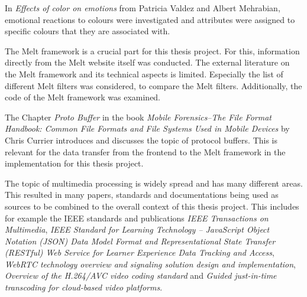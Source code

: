 \documentclass[../MasterThesis.tex]{subfiles}
\begin{document}
\begin{description}[font=\color{RedViolet!80!black}, style=nextline]
		
		In \textit{Effects of color on emotions} from Patricia Valdez and Albert Mehrabian, emotional reactions to colours were investigated and attributes were assigned to specific colours that they are associated with.~\cite{colour2}
	
		
		
		\item[Melt framework]
		
		
		The Melt framework is a crucial part for this thesis project. For this, information directly from the Melt website itself was conducted. The external literature on the Melt framework and its technical aspects is limited. Especially the list of different Melt filters was considered, to compare the Melt filters. Additionally, the code of the Melt framework was examined.~\cite{melt, melt_filters, melt_code}

		
	
		
		
		\item[Protocol buffer] 
		
		The Chapter \textit{Proto Buffer} in the book \textit{Mobile Forensics--The File Format Handbook: Common File Formats and File Systems Used in Mobile Devices} by Chris Currier introduces and discusses the topic of protocol buffers. This is relevant for the data transfer from the frontend to the Melt framework in the implementation for this thesis project.~\cite{protobuffer}
		
		
		
		
				
		
		
		\item[Multimedia processing] 
		
		The topic of multimedia processing is widely spread and has many different areas. This resulted in many papers, standards and documentations being used as sources to be combined to the overall context of this thesis project. This includes for example the IEEE standards and publications \textit{IEEE Transactions on Multimedia}, \textit{IEEE Standard for Learning Technology -- JavaScript Object Notation (JSON) Data Model Format and Representational State Transfer (RESTful) Web Service for Learner Experience Data Tracking and Access}, \textit{WebRTC technology overview and signaling solution design and implementation}, \textit{Overview of the H.264/AVC video coding standard} and \textit{Guided just-in-time transcoding for cloud-based video platforms}.~\cite{transcoding, IEEE_Rest, webrtc, h264, JIT_IEEE}
		

\end{description}
\end{document}
